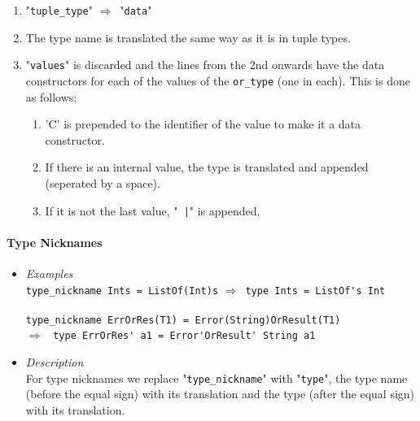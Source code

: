 \documentclass{article}
\def\lra{$\Longrightarrow$\ }
\begin{document}
\begin{itemize}
\begin{enumerate}
\item
"\verb|tuple_type|" \lra "\texttt{data}"

\item
The type name is translated the same way as it is in tuple types.

\item
"\texttt{values}" is discarded and the lines from the 2nd onwards have the data
constructors for each of the values of the \verb|or_type| (one in each). This
is done as follows:

\begin{enumerate}

\item
'C' is prepended to the identifier of the value to make it a data constructor.

\item
If there is an internal value, the type is translated and appended (seperated
by a space).

\item
If it is not the last value, "\texttt{ |}" is appended.

\end{enumerate}

\end{enumerate}

\end{itemize}

\paragraph{Type Nicknames}


\begin{itemize}
\item
\textit{Examples}\\

\verb|type_nickname Ints = ListOf(Int)s| \lra \verb|type Ints = ListOf's Int|
\\
\\
\verb|type_nickname ErrOrRes(T1) = Error(String)OrResult(T1)|
\\
\lra
\verb|type ErrOrRes' a1 = Error'OrResult' String a1|
\item
\textit{Description}\\

For type nicknames we replace "\verb|type_nickname|" with "\verb|type|",
the type name (before the equal sign) with its translation and the
type (after the equal sign) with its translation.

\end{itemize}
\end{document}
